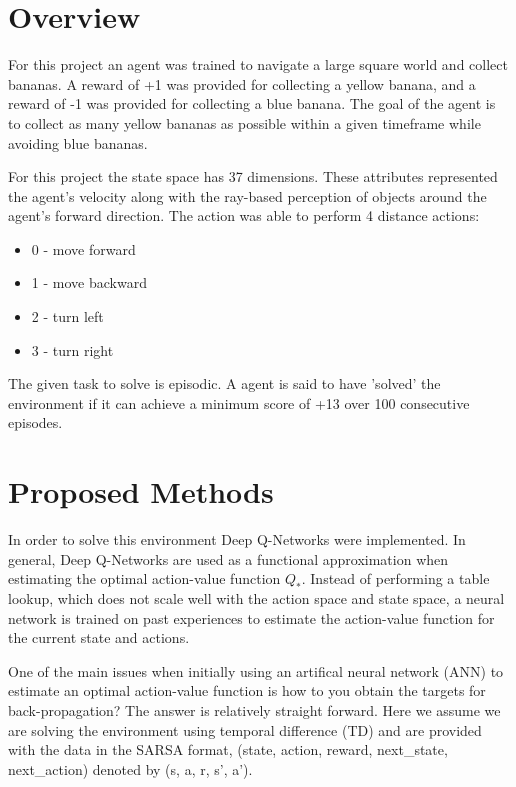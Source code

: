 \documentclass[12pt]{article}
\begin{document}
\maketitle


\section{Overview}
For this project an agent was trained to navigate a large square world and collect bananas.
A reward of +1 was provided for collecting a yellow banana, and a reward of -1 was provided for collecting a blue banana.
The goal of the agent is to collect as many yellow bananas as possible within a given timeframe while avoiding blue bananas.

For this project the state space has 37 dimensions. These attributes represented the agent's velocity along with the ray-based perception
of objects around the agent's forward direction.
The action was able to perform 4 distance actions:

\begin{center}
\begin{itemize}
\item 0 - move forward
\item 1 - move backward
\item 2 - turn left
\item 3 - turn right
\end{itemize}
\end{center}
The given task to solve is episodic. 
A agent is said to have 'solved' the environment if it can achieve a minimum score of +13 over 100 consecutive episodes.

\section{Proposed Methods}
\label{methods}
In order to solve this environment Deep Q-Networks \cite{deep_q_networks} were implemented.
In general, Deep Q-Networks are used as a functional approximation when estimating the optimal action-value function $Q_*$.
Instead of performing a table lookup, which does not scale well with the action space and state space, a neural network is trained
on past experiences to estimate the action-value function for the current state and actions.

One of the main issues when initially using an artifical neural network (ANN) to estimate an optimal action-value function 
is how to you obtain the targets for back-propagation?
The answer is relatively straight forward.
Here we assume we are solving the environment using temporal difference (TD) and are provided with the data in 
the SARSA format, (state, action, reward, next\_state, next\_action) denoted by (s, a, r, s', a').
\end{document}
